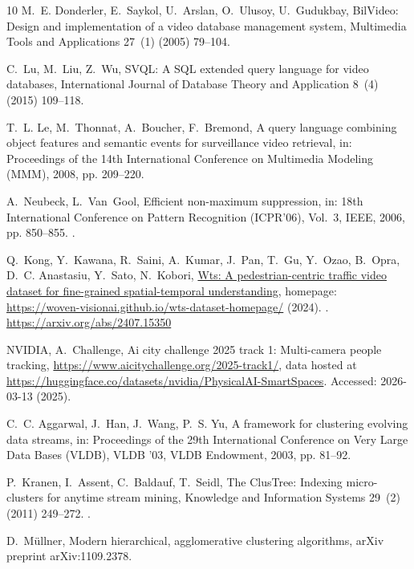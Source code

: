 \documentclass[5p,times]{elsarticle}
\begin{document}
\begin{thebibliography}{10}
M.~E. Donderler, E.~Saykol, U.~Arslan, O.~Ulusoy, U.~Gudukbay, {BilVideo}: Design and implementation of a video database management system, Multimedia Tools and Applications 27~(1) (2005) 79--104.

C.~Lu, M.~Liu, Z.~Wu, {SVQL}: A {SQL} extended query language for video databases, International Journal of Database Theory and Application 8~(4) (2015) 109--118.

T.~L. Le, M.~Thonnat, A.~Boucher, F.~Bremond, A query language combining object features and semantic events for surveillance video retrieval, in: Proceedings of the 14th International Conference on Multimedia Modeling (MMM), 2008, pp. 209--220.

A.~Neubeck, L.~Van~Gool, Efficient non-maximum suppression, in: 18th International Conference on Pattern Recognition (ICPR'06), Vol.~3, IEEE, 2006, pp. 850--855.
\newblock \href {http://dx.doi.org/10.1109/ICPR.2006.479} {}.

Q.~Kong, Y.~Kawana, R.~Saini, A.~Kumar, J.~Pan, T.~Gu, Y.~Ozao, B.~Opra, D.~C. Anastasiu, Y.~Sato, N.~Kobori, \href{https://arxiv.org/abs/2407.15350}{Wts: A pedestrian-centric traffic video dataset for fine-grained spatial-temporal understanding}, homepage: \url{https://woven-visionai.github.io/wts-dataset-homepage/} (2024).
\newblock \href {http://arxiv.org/abs/2407.15350} {}.
\newline\urlprefix\url{https://arxiv.org/abs/2407.15350}

NVIDIA, A.~Challenge, Ai city challenge 2025 track 1: Multi-camera people tracking, \url{https://www.aicitychallenge.org/2025-track1/}, data hosted at \url{https://huggingface.co/datasets/nvidia/PhysicalAI-SmartSpaces}. Accessed: 2026-03-13 (2025).

C.~C. Aggarwal, J.~Han, J.~Wang, P.~S. Yu, A framework for clustering evolving data streams, in: Proceedings of the 29th International Conference on Very Large Data Bases (VLDB), VLDB '03, VLDB Endowment, 2003, pp. 81--92.

P.~Kranen, I.~Assent, C.~Baldauf, T.~Seidl, The {ClusTree}: Indexing micro-clusters for anytime stream mining, Knowledge and Information Systems 29~(2) (2011) 249--272.
\newblock \href {http://dx.doi.org/10.1007/s10115-010-0342-8} {}.

D.~M{\"u}llner, Modern hierarchical, agglomerative clustering algorithms, arXiv preprint arXiv:1109.2378.

\end{thebibliography}
\end{document}
